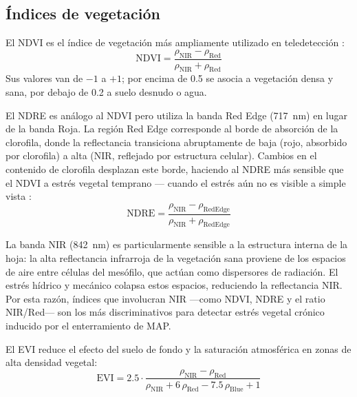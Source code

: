 \subsection{Índices de vegetación}

El \ac{NDVI} es el índice de vegetación más ampliamente utilizado en
teledetección \cite{makki2017}:
\begin{equation}
  \text{NDVI} = \frac{\rho_{\text{NIR}} - \rho_{\text{Red}}}
                     {\rho_{\text{NIR}} + \rho_{\text{Red}}}
  \label{eq:ndvi}
\end{equation}
Sus valores van de $-1$ a $+1$; por encima de 0.5 se asocia a vegetación
densa y sana, por debajo de 0.2 a suelo desnudo o agua.

El \ac{NDRE} es análogo al \ac{NDVI} pero utiliza la banda Red Edge
(\SI{717}{nm}) en lugar de la banda Roja. La región Red Edge corresponde
al borde de absorción de la clorofila, donde la reflectancia transiciona
abruptamente de baja (rojo, absorbido por clorofila) a alta (NIR, reflejado
por estructura celular). Cambios en el contenido de clorofila desplazan
este borde, haciendo al \ac{NDRE} más sensible que el \ac{NDVI} a estrés
vegetal temprano — cuando el estrés aún no es visible a simple vista
\cite{makki2017}:
\begin{equation}
  \text{NDRE} = \frac{\rho_{\text{NIR}} - \rho_{\text{RedEdge}}}
                     {\rho_{\text{NIR}} + \rho_{\text{RedEdge}}}
  \label{eq:ndre}
\end{equation}

La banda \ac{NIR} (\SI{842}{nm}) es particularmente sensible a la estructura
interna de la hoja: la alta reflectancia infrarroja de la vegetación sana
proviene de los espacios de aire entre células del mesófilo, que actúan como
dispersores de radiación. El estrés hídrico y mecánico colapsa estos espacios,
reduciendo la reflectancia \ac{NIR}. Por esta razón, índices que involucran
\ac{NIR} —como \ac{NDVI}, \ac{NDRE} y el ratio NIR/Red— son los más
discriminativos para detectar estrés vegetal crónico inducido por el
enterramiento de \ac{MAP}.

El \ac{EVI} reduce el efecto del suelo de fondo y la saturación
atmosférica en zonas de alta densidad vegetal:
\begin{equation}
  \text{EVI} = 2.5 \cdot
  \frac{\rho_{\text{NIR}} - \rho_{\text{Red}}}
       {\rho_{\text{NIR}} + 6\,\rho_{\text{Red}} - 7.5\,\rho_{\text{Blue}} + 1}
  \label{eq:evi}
\end{equation}

